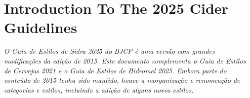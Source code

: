 \section*{Introduction To The 2025 Cider Guidelines}

\textit{O Guia de Estilos de Sidra 2025 do BJCP é uma versão com grandes modificações da edição de 2015. Este documento complementa o Guia de Estilos de Cervejas 2021 e o Guia de Estilos de Hidromel 2025. Embora parte do conteúdo de 2015 tenha sido mantido, houve a reorganização e renomeação de categorias e estilos, incluindo a adição de alguns novos estilos.}
